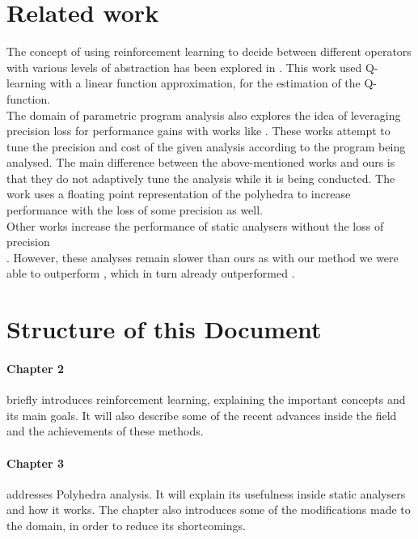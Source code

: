 \section{Related work}
The concept of using reinforcement learning to decide between different operators with various levels of abstraction has been explored in \cite{singh2018fast}. This work used Q-learning with a linear function approximation, for the estimation of the Q-function.\\
The domain of parametric program analysis also explores the idea of leveraging precision loss for performance gains with works like \cite{oh2015learning,oh2014selective,liang2011learning}. These works attempt to tune the precision and cost of the given analysis according to the program being analysed. The main difference between the above-mentioned works and ours is that they do not adaptively tune the analysis while it is being conducted. The work \cite{chen2008sound} uses a floating point representation of the polyhedra to increase performance with the loss of some precision as well.\\
Other works increase the performance of static analysers without the loss of precision \\ \cite{singh2015making,singh2017fast}. However, these analyses remain slower than ours as with our method we were able to outperform \cite{singh2018fast}, which in turn already outperformed \cite{singh2017fast}. 


\section{Structure of this Document}

\paragraph{Chapter 2}briefly introduces reinforcement learning, explaining the important concepts and its main goals. It will also describe some of the recent advances inside the field and the achievements of these methods.

\paragraph{Chapter 3}addresses Polyhedra analysis. It will explain its usefulness inside static analysers and how it works. The chapter also introduces some of the modifications made to the domain, in order to reduce its shortcomings.


